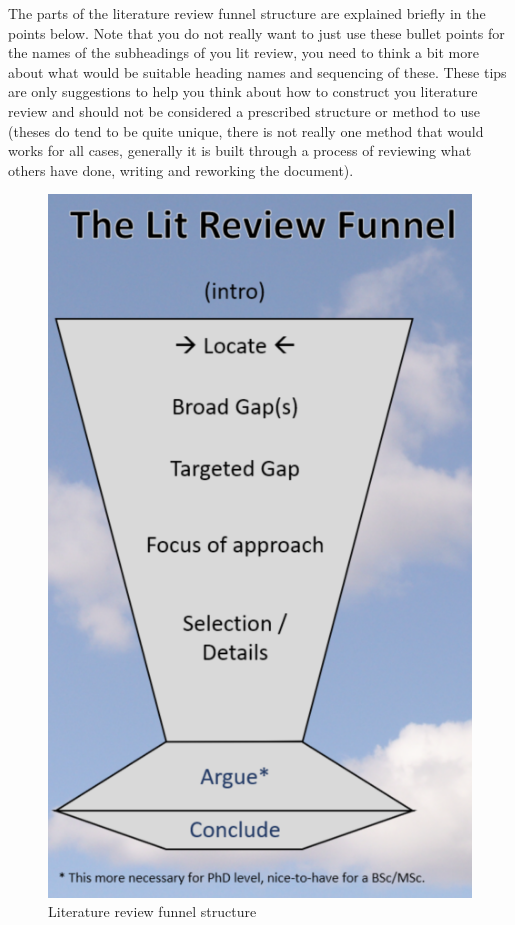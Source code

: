 The parts of the literature review funnel structure are explained briefly in the points below. Note that you do not really want to just use these bullet points for the names of the subheadings of you lit review, you need to think a bit more about what would be suitable heading names and sequencing of these. These tips are only suggestions to help you think about how to construct you literature review and should not be considered a prescribed structure or method to use (theses do tend to be quite unique, there is not really one method that would works for all cases, generally it is built through a process of reviewing what others have done, writing and reworking the document).

\begin{figure}
	\centering
	\includegraphics[width=0.7\linewidth]{Chapters/Figures/litreview_funnel}
	\caption{Literature review funnel structure}
	\label{fig:litreviewfunnel}
\end{figure}

